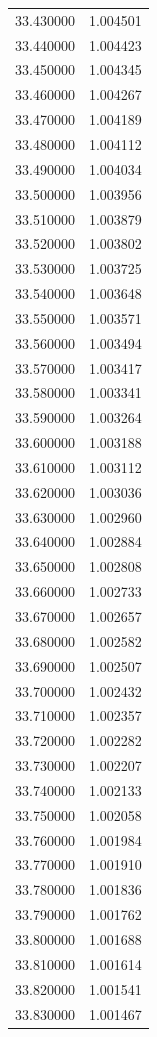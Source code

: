 \begin{tabular}{rr}
33.430000 & 1.004501 \\
33.440000 & 1.004423 \\
33.450000 & 1.004345 \\
33.460000 & 1.004267 \\
33.470000 & 1.004189 \\
33.480000 & 1.004112 \\
33.490000 & 1.004034 \\
33.500000 & 1.003956 \\
33.510000 & 1.003879 \\
33.520000 & 1.003802 \\
33.530000 & 1.003725 \\
33.540000 & 1.003648 \\
33.550000 & 1.003571 \\
33.560000 & 1.003494 \\
33.570000 & 1.003417 \\
33.580000 & 1.003341 \\
33.590000 & 1.003264 \\
33.600000 & 1.003188 \\
33.610000 & 1.003112 \\
33.620000 & 1.003036 \\
33.630000 & 1.002960 \\
33.640000 & 1.002884 \\
33.650000 & 1.002808 \\
33.660000 & 1.002733 \\
33.670000 & 1.002657 \\
33.680000 & 1.002582 \\
33.690000 & 1.002507 \\
33.700000 & 1.002432 \\
33.710000 & 1.002357 \\
33.720000 & 1.002282 \\
33.730000 & 1.002207 \\
33.740000 & 1.002133 \\
33.750000 & 1.002058 \\
33.760000 & 1.001984 \\
33.770000 & 1.001910 \\
33.780000 & 1.001836 \\
33.790000 & 1.001762 \\
33.800000 & 1.001688 \\
33.810000 & 1.001614 \\
33.820000 & 1.001541 \\
33.830000 & 1.001467 \\

\end{tabular}
